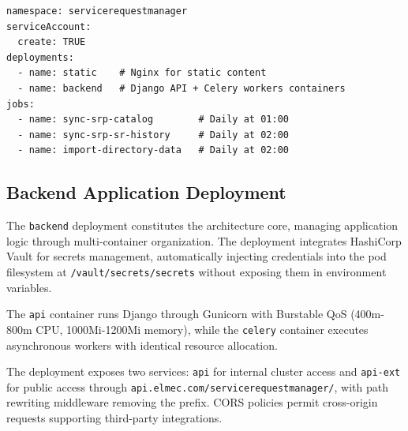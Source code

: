 \begin{listing}[htbp]
\begin{verbatim}
namespace: servicerequestmanager
serviceAccount:
  create: TRUE
deployments:
  - name: static    # Nginx for static content
  - name: backend   # Django API + Celery workers containers
jobs:
  - name: sync-srp-catalog        # Daily at 01:00
  - name: sync-srp-sr-history     # Daily at 02:00
  - name: import-directory-data   # Daily at 02:00
\end{verbatim}
\caption{High-Level Kubernetes Deployment Structure for SRM}
\label{lst:k8s_structure}
\end{listing}

\subsection{Backend Application Deployment}

The \texttt{backend} deployment constitutes the architecture core, managing application logic through multi-container organization. The deployment integrates HashiCorp Vault \cite{vault} for secrets management, automatically injecting credentials into the pod filesystem at \texttt{/vault/secrets/secrets} without exposing them in environment variables.

The \texttt{api} container runs Django through Gunicorn with Burstable QoS \cite{burstable_qos} (400m-800m CPU, 1000Mi-1200Mi memory), while the \texttt{celery} container executes asynchronous workers with identical resource allocation. %


The deployment exposes two services: \texttt{api} for internal cluster access and \texttt{api-ext} for public access through \texttt{api.elmec.com/servicerequestmanager/}, with path rewriting middleware removing the prefix. CORS policies permit cross-origin requests supporting third-party integrations.

